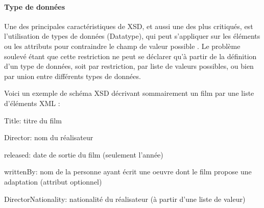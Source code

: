 \paragraph{Type de données}
Une des principales caractéristiques de XSD, et aussi une des plus critiqués, est l'utilisation de types de données (Datatype), qui peut s'appliquer sur les éléments ou les attributs pour contraindre le champ de valeur possible .
Le problème soulevé étant que cette restriction ne peut se déclarer qu'à partir de la définition d'un type de données, soit par restriction, par liste de valeurs possibles, ou bien par union entre différents types de données.


Voici un exemple de schéma XSD décrivant sommairement un film par une liste d'éléments XML : 
\begin{liste}
	\item Title: titre du film
	\item Director: nom du réalisateur
	\item released: date de sortie du film (seulement l'année)
	\item writtenBy: nom de la personne ayant écrit une oeuvre dont le film propose une adaptation (attribut optionnel)
	\item DirectorNationality: nationalité du réalisateur (à partir d'une liste de valeur)
\end{liste}

